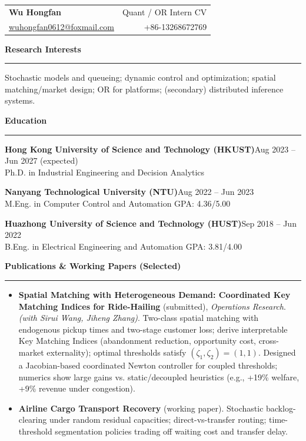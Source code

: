 \documentclass[11pt,a4paper]{article}
\newcommand{\cvsection}[1]{\vspace{2pt}\noindent\textbf{\large #1}\\[-2pt]\textcolor{cvgray}{\rule{\linewidth}{0.4pt}}\vspace{2pt}}
\newcommand{\cvname}[1]{{\huge\textbf{#1}}}
\newcommand{\cvitem}[2]{\textbf{#1}\hfill \textcolor{cvgray}{#2}\\}
\newcommand{\cvsmall}{\fontsize{10pt}{12pt}\selectfont}
\begin{document}
\cvsmall

\begin{tabularx}{\linewidth}{@{}X r@{}}
\cvname{Wu Hongfan} & \textcolor{cvgray}{Quant / OR Intern CV}\\[-1pt]
\href{mailto:wuhongfan0612@foxmail.com}{wuhongfan0612@foxmail.com} & +86-13268672769\\
\end{tabularx}

\vspace{6pt}

\cvsection{Research Interests}
Stochastic models and queueing; dynamic control and optimization; spatial matching/market design; OR for platforms; (secondary) distributed inference systems.

\cvsection{Education}
\cvitem{Hong Kong University of Science and Technology (HKUST)}{Aug 2023 -- Jun 2027 (expected)}
Ph.D. in Industrial Engineering and Decision Analytics

\cvitem{Nanyang Technological University (NTU)}{Aug 2022 -- Jun 2023}
M.Eng. in Computer Control and Automation \hfill GPA: 4.36/5.00

\cvitem{Huazhong University of Science and Technology (HUST)}{Sep 2018 -- Jun 2022}
B.Eng. in Electrical Engineering and Automation \hfill GPA: 3.81/4.00

\cvsection{Publications \& Working Papers (Selected)}
\begin{itemize}
  \item \textbf{Spatial Matching with Heterogeneous Demand: Coordinated Key Matching Indices for Ride-Hailing} (submitted), \emph{Operations Research}.\\
  \emph{(with Sirui Wang, Jiheng Zhang)}. Two-class spatial matching with endogenous pickup times and two-stage customer loss; derive interpretable Key Matching Indices (abandonment reduction, opportunity cost, cross-market externality); optimal thresholds satisfy $(\zeta_1,\zeta_2)=(1,1)$. Designed a Jacobian-based coordinated Newton controller for coupled thresholds; numerics show large gains vs. static/decoupled heuristics (e.g., +19\% welfare, +9\% revenue under congestion).

  \item \textbf{Airline Cargo Transport Recovery} (working paper). Stochastic backlog-clearing under random residual capacities; direct-vs-transfer routing; time-threshold segmentation policies trading off waiting cost and transfer delay.
\end{itemize}
\end{document}

